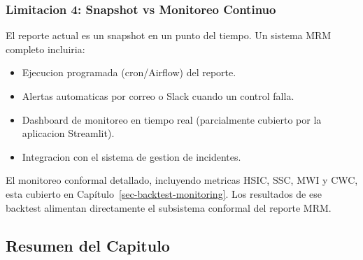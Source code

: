 \documentclass[
  spanish,
  11pt,
  letterpaper,
]{scrbook}
\providecommand{\tightlist}{%
  \setlength{\itemsep}{0pt}\setlength{\parskip}{0pt}}
\theoremstyle{plain}
\theoremstyle{remark}
\begin{document}
\subsubsection{Limitacion 4: Snapshot vs Monitoreo
Continuo}\label{limitacion-4-snapshot-vs-monitoreo-continuo}

El reporte actual es un snapshot en un punto del tiempo. Un sistema MRM
completo incluiria:

\begin{itemize}
\tightlist
\item
  Ejecucion programada (cron/Airflow) del reporte.
\item
  Alertas automaticas por correo o Slack cuando un control falla.
\item
  Dashboard de monitoreo en tiempo real (parcialmente cubierto por la
  aplicacion Streamlit).
\item
  Integracion con el sistema de gestion de incidentes.
\end{itemize}

\begin{tcolorbox}[enhanced jigsaw, arc=.35mm, bottomrule=.15mm, bottomtitle=1mm, breakable, colback=white, colbacktitle=quarto-callout-note-color!10!white, colframe=quarto-callout-note-color-frame, coltitle=black, left=2mm, leftrule=.75mm, opacityback=0, opacitybacktitle=0.6, rightrule=.15mm, title=\textcolor{quarto-callout-note-color}{\faInfo}\hspace{0.5em}{Conexion con el Backtest Conformal}, titlerule=0mm, toprule=.15mm, toptitle=1mm]

El monitoreo conformal detallado, incluyendo metricas HSIC, SSC, MWI y
CWC, esta cubierto en Capítulo~\ref{sec-backtest-monitoring}. Los
resultados de ese backtest alimentan directamente el subsistema
conformal del reporte MRM.

\end{tcolorbox}

\subsection{Resumen del Capitulo}\label{resumen-del-capitulo}
\end{document}
